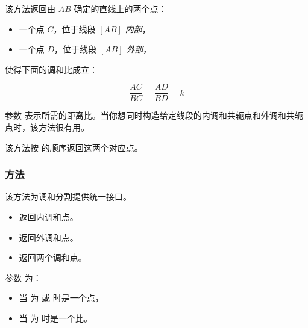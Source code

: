 该方法返回由 $AB$ 确定的直线上的两个点：

\begin{itemize}
  \item 一个点 $C$，位于线段 $[AB]$ \emph{内部}，
  \item 一个点 $D$，位于线段 $[AB]$ \emph{外部}，
\end{itemize}

  使得下面的调和比成立：

\[
\frac{AC}{BC} = \frac{AD}{BD} = k
\]


参数  表示所需的距离比。当你想同时构造给定线段的内调和共轭点和外调和共轭点时，该方法很有用。

\medskip

该方法按  的顺序返回这两个对应点。

\vspace{2em}
\begin{tkzexample}
\begin{center}
\end{center}
\end{tkzexample}

\subsubsection{方法 }
\label{ssub:harmonic}

该方法为调和分割提供统一接口。

\begin{itemize}
  \item {} 返回内调和点。
  \item {} 返回外调和点。
  \item {} 返回两个调和点。
\end{itemize}

参数  为：
\begin{itemize}
  \item 当  为  或  时是一个点，
  \item 当  为  时是一个比。
\end{itemize}

